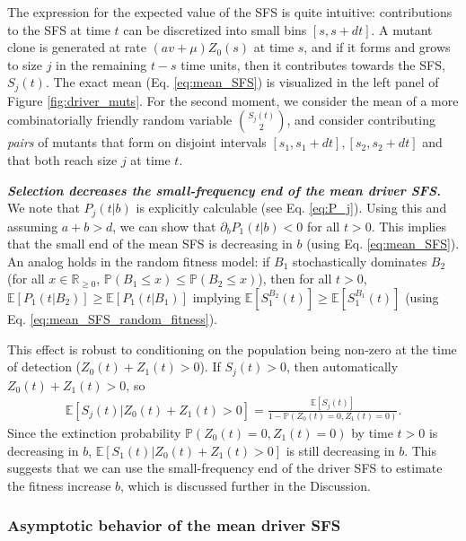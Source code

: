 \documentclass{article}
\numberwithin{equation}{section}
\begin{document}
The expression for the expected value of the SFS is quite intuitive: contributions to the SFS at time $t$ can be discretized into small bins $[s,s+dt]$. A mutant clone is generated at rate $(av+\mu) Z_0(s)$ at time $s$, and if it forms and grows to size $j$ in the remaining $t-s$ time units, then it contributes towards the SFS, $S_j(t)$. The exact mean (Eq. \ref{eq:mean_SFS}) is visualized in the left panel of Figure \ref{fig:driver_muts}.  For the second moment, we consider the mean of a more combinatorially friendly random variable $S_j(t)\choose 2$, and consider contributing \textit{pairs} of mutants that form on disjoint intervals $[s_1,s_1+dt],[s_2,s_2+dt]$ and that both reach size $j$ at time $t$.

{\bf \em Selection decreases the small-frequency end of the mean driver SFS.} We note that $P_j(t|b)$ is explicitly calculable (see Eq. \ref{eq:P_j}). Using this and assuming $a+b>d$, we can show that $\partial_b P_1(t|b)<0$ for all $t>0$. This implies that the small end of the mean SFS is decreasing in $b$ (using Eq. \ref{eq:mean_SFS}). An analog holds in the random fitness model: if $B_1$ stochastically dominates $B_2$ (for all $x\in\mathbb{R}_{\geq 0}$, $\mathbb{P}(B_1\leq x)\leq \mathbb{P}(B_2\leq x)$), then for all $t>0$, $\mathbb{E}[P_1(t|B_2)]\geq \mathbb{E}[P_1(t|B_1)]$ implying $\mathbb{E}[S_1^{B_2}(t)]\geq \mathbb{E}[S_1^{B_1}(t)]$ (using Eq. \ref{eq:mean_SFS_random_fitness}).

This effect is robust to conditioning on the population being non-zero at the time of detection ($Z_0(t)+Z_1(t)>0$). If $S_j(t)>0$, then automatically $Z_0(t)+Z_1(t)>0$, so
\begin{align}
  \mathbb{E}[S_j(t)|Z_0(t)+Z_1(t)>0]=\frac{\mathbb{E}[S_j(t)]}{1-\mathbb{P}(Z_0(t)=0,Z_1(t)=0)}.\label{eq:SFS_conditional}
\end{align}
Since the extinction probability $\mathbb{P}(Z_0(t)=0,Z_1(t)=0)$ by time $t>0$ is decreasing in $b$, $\mathbb{E}[S_1(t)|Z_0(t)+Z_1(t)>0]$ is still decreasing in $b$. This suggests that we can use the small-frequency end of the driver SFS to estimate the fitness increase $b$, which is discussed further in the Discussion.







\subsubsection{Asymptotic behavior of the mean driver SFS}\label{sec:mean_j_scaling}
\end{document}
